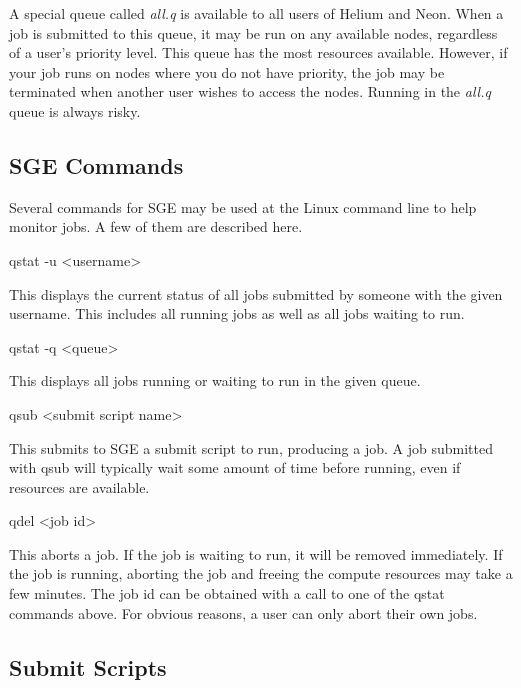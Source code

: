 \documentclass[12pt]{article}
\newenvironment{codeindent}
{\begin{list}{}
        {\setlength{\leftmargin}{.1in}}
        \item[]
}
{\end{list}}
\begin{document}
A special queue called \emph{all.q} is available to all users of Helium and Neon. When a job is submitted to this queue, it may be run on any available nodes, regardless of a user's priority level. This queue has the most resources available. However, if your job runs on nodes where you do not have priority, the job may be terminated when another user wishes to access the nodes. Running in the \emph{all.q} queue is always risky.

\subsection{SGE Commands} \label{sec: sge commands}

Several commands for SGE may be used at the Linux command line to help monitor jobs. A few of them are described here.

\begin{codeindent}
 qstat -u <username>
\end{codeindent}
This displays the current status of all jobs submitted by someone with the given username. This includes all running jobs as well as all jobs waiting to run.

\begin{codeindent}
 qstat -q <queue>
\end{codeindent}
This displays all jobs running or waiting to run in the given queue.

\begin{codeindent}
 qsub <submit script name>
\end{codeindent}
This submits to SGE a submit script to run, producing a job. A job submitted with qsub will typically wait some amount of time before running, even if resources are available.

\begin{codeindent}
 qdel <job id>
\end{codeindent}
This aborts a job. If the job is waiting to run, it will be removed immediately. If the job is running, aborting the job and freeing the compute resources may take a few minutes. The job id can be obtained with a call to one of the qstat commands above. For obvious reasons, a user can only abort their own jobs.

\subsection{Submit Scripts} \label{sec: submit scripts}
\end{document}
